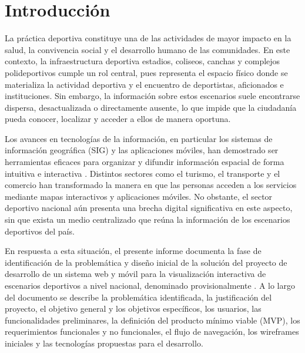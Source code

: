 
\section{Introducci\'on}

La pr\'actica deportiva constituye una de las actividades de mayor impacto en la
salud, la convivencia social y el desarrollo humano de las comunidades. En este
contexto, la infraestructura deportiva \textemdash{}estadios, coliseos, canchas y
complejos polideportivos\textemdash{} cumple un rol central, pues representa el
espacio f\'isico donde se materializa la actividad deportiva y el encuentro de
deportistas, aficionados e instituciones. Sin embargo, la informaci\'on sobre
estos escenarios suele encontrarse dispersa, desactualizada o directamente
ausente, lo que impide que la ciudadan\'ia pueda conocer, localizar y acceder a
ellos de manera oportuna.

Los avances en tecnolog\'ias de la informaci\'on, en particular los sistemas de
informaci\'on geogr\'afica (SIG) y las aplicaciones m\'oviles, han demostrado ser
herramientas eficaces para organizar y difundir informaci\'on espacial de forma
intuitiva e interactiva \citep{longley2015}. Distintos sectores como el turismo,
el transporte y el comercio han transformado la manera en que las personas
acceden a los servicios mediante mapas interactivos y aplicaciones m\'oviles. No
obstante, el sector deportivo nacional a\'un presenta una brecha digital
significativa en este aspecto, sin que exista un medio centralizado que re\'una
la informaci\'on de los escenarios deportivos del pa\'is.

En respuesta a esta situaci\'on, el presente informe documenta la fase de
identificaci\'on de la problem\'atica y dise\~no inicial de la soluci\'on del
proyecto de desarrollo de un sistema web y m\'ovil para la visualizaci\'on
interactiva de escenarios deportivos a nivel nacional, denominado
provisionalmente \nombreApp{}. A lo largo del documento se describe la
problem\'atica identificada, la justificaci\'on del proyecto, el objetivo general
y los objetivos espec\'ificos, los usuarios, las funcionalidades preliminares, la
definici\'on del producto m\'inimo viable (MVP), los requerimientos funcionales y
no funcionales, el flujo de navegaci\'on, los wireframes iniciales y las
tecnolog\'ias propuestas para el desarrollo.

